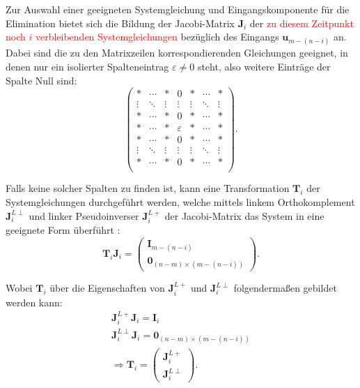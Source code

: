 Zur Auswahl einer geeigneten Systemgleichung und Eingangskomponente für die Elimination bietet sich die Bildung der Jacobi-Matrix $\mathbf{J}_i$ der  \textcolor{red}{zu diesem Zeitpunkt noch $i$ verbleibenden Systemgleichungen} bezüglich des Eingangs $\mathbf{u}_{m-(n-i)}$ an. Dabei sind die zu den Matrixzeilen korrespondierenden Gleichungen geeignet, in denen nur ein isolierter Spalteneintrag $\varepsilon \neq 0$ steht, also weitere Einträge der Spalte Null sind:
\begin{equation}
	\begin{pmatrix}
	* & \cdots & * & 0 & * & \cdots & *\\
	\vdots & \ddots & \vdots & \vdots & \vdots & \ddots & \vdots \\
	* & \cdots & * & 0 & * & \cdots & *  \\
	* & \cdots & * & \varepsilon & * & \cdots & * \\
	* & \cdots & * & 0 & * & \cdots & *  \\
	\vdots & \ddots & \vdots & \vdots & \vdots & \ddots & \vdots \\
	* & \cdots & * & 0 & * & \cdots & *\\
	\end{pmatrix}.
\end{equation}

Falls keine solcher Spalten zu finden ist, kann eine Transformation $\mathbf{T}_i$ der Systemgleichungen durchgeführt werden, welche mittels linkem Orthokomplement $\mathbf{J}_i^{L \perp}$ und linker Pseudoinverser $\mathbf{J}_i^{L +}$ der Jacobi-Matrix das System in eine geeignete Form überführt \cite[Abschnitt 2.1.2]{Fritzsche2016}:
\begin{equation}
	\mathbf{T}_i \mathbf{J}_i = 
	\begin{pmatrix}
		\mathbf{I}_{m-(n-i)} \\
		\mathbf{0}_{(n-m) \times (m-(n-i))}
	\end{pmatrix}.
\end{equation}

Wobei $\mathbf{T}_i$ über die Eigenschaften von $\mathbf{J}_i^{L +}$ und  $\mathbf{J}_i^{L \perp}$ folgendermaßen gebildet werden kann:
\begin{align}
	\mathbf{J}_i^{L +} \mathbf{J}_i = \mathbf{I}_i \\
	\mathbf{J}_i^{L \perp} \mathbf{J}_i = \mathbf{0}_{(n-m) \times (m-(n-i))} \\
	\Rightarrow \mathbf{T}_i = 
	\begin{pmatrix}
		\mathbf{J}_i^{L +} \\
		\mathbf{J}_i^{L \perp}
	\end{pmatrix} .
\end{align}

